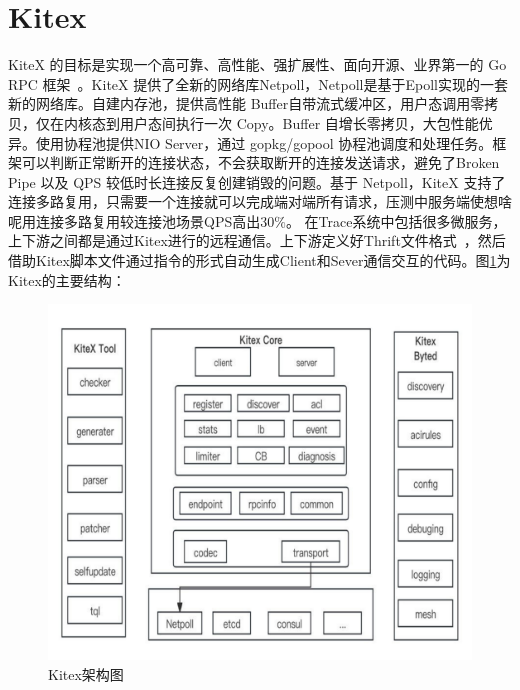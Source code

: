 \section{Kitex} 
KiteX 的目标是实现一个高可靠、高性能、强扩展性、面向开源、业界第一的 Go RPC 框架~\cite{王伟2013rpci}。KiteX 提供了全新的网络库Netpoll，Netpoll是基于Epoll实现的一套新的网络库。自建内存池，提供高性能 Buffer自带流式缓冲区，用户态调用零拷贝，仅在内核态到用户态间执行一次 Copy。Buffer 自增长零拷贝，大包性能优异。使用协程池提供NIO Server，通过 gopkg/gopool 协程池调度和处理任务。框架可以判断正常断开的连接状态，不会获取断开的连接发送请求，避免了Broken Pipe 以及 QPS 较低时长连接反复创建销毁的问题。基于 Netpoll，KiteX 支持了连接多路复用，只需要一个连接就可以完成端对端所有请求，压测中服务端使想啥呢用连接多路复用较连接池场景QPS高出30$\%$。
在Trace系统中包括很多微服务，上下游之间都是通过Kitex进行的远程通信。上下游定义好Thrift文件格式~\cite{田翠珍2016基于}，然后借助Kitex脚本文件通过指令的形式自动生成Client和Sever通信交互的代码。图\ref{Kitex}为Kitex的主要结构：
\begin{figure}[htb]
  \centering
  \includegraphics[width=5in]{figure/chapter2/Kitex架构图.pdf}
  \caption{Kitex架构图}\label{Kitex}
\end{figure}
